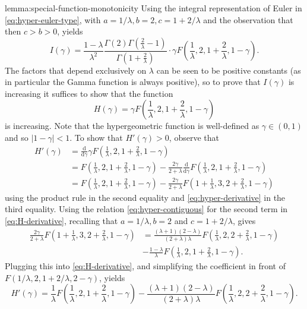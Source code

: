 \documentclass[11pt]{article}
\newcommand{\dd}{\mathrm{d}}
\begin{document}
\begin{cleverproof}{lemma:special-function-monotonicity}
Using the integral representation of Euler in \eqref{eq:hyper-euler-type}, with $a = 1/\lambda, b = 2, c = 1 + 2/\lambda$ and the observation that then $c > b > 0$, yields
$$
I(\gamma) = \frac{1-\lambda}{\lambda^2} \frac{\Gamma(2)\Gamma(\frac{2}{\lambda}-1)}{\Gamma(1+\frac{2}{\lambda})}\cdot\gamma F\left(\frac{1}{\lambda},2,1+\frac{2}{\lambda},1-\gamma\right).
$$
The factors that depend exclusively on $\lambda$ can be seen to be positive constants (as in particular the Gamma function is always positive), so to prove that $I(\gamma)$ is increasing it suffices to show that the function
$$
H(\gamma) = \gamma F\left(\frac{1}{\lambda},2,1+\frac{2}{\lambda},1-\gamma\right)
$$
is increasing. Note that the hypergeometric function is well-defined as $\gamma \in (0,1)$ and so $|1-\gamma| < 1$.
    To show that $H'(\gamma)>0$, observe that
    \begin{align}
    H'(\gamma) &=         \frac{\dd }{\dd \gamma}\gamma F\left(\frac{1}{\lambda},2,1+\frac{2}{\lambda},1-\gamma\right) \nonumber \\
        &=F\left(\frac{1}{\lambda},2,1+\frac{2}{\lambda},1-\gamma\right)-\frac{2\gamma}{2+\lambda} \frac{\dd }{\dd \gamma}F\left(\frac{1}{\lambda},2,1+\frac{2}{\lambda},1-\gamma\right) \nonumber \\
        &=F\left(\frac{1}{\lambda},2,1+\frac{2}{\lambda},1-\gamma\right)-\frac{2\gamma}{2+\lambda} F\left(1+\frac{1}{\lambda},3,2+\frac{2}{\lambda},1-\gamma\right) 
        \label{eq:H-derivative}
    \end{align}
    using the product rule in the second equality and \eqref{eq:hyper-derivative} in the third equality.
    Using the relation \eqref{eq:hyper-contiguous} for the second term in \eqref{eq:H-derivative}, recalling that $a = 1/\lambda, b = 2$ and $c = 1 + 2/\lambda$, gives
    \begin{align*}
        \frac{2\gamma}{2+\lambda} F\left(1+\frac{1}{\lambda},3,2+\frac{2}{\lambda},1-\gamma\right)&=\frac{(\lambda+1)(2-\lambda)}{\left(2+\lambda\right)\lambda}F\left(\frac{1}{\lambda},2,2+\frac{2}{\lambda},1-\gamma\right)\\&-\frac{1-\lambda}{\lambda}F\left(\frac{1}{\lambda},2,1+\frac{2}{\lambda},1-\gamma\right).    
    \end{align*}
    Plugging this into \eqref{eq:H-derivative}, and simplifying the coefficient in front of $F(1/\lambda,2,1 + 2/\lambda,2-\gamma)$, yields
    $$
    H'(\gamma)=\frac{1}{\lambda}F\left(\frac{1}{\lambda},2,1+\frac{2}{\lambda},1-\gamma\right)-\frac{(\lambda+1)(2-\lambda)}{\left(2+\lambda\right)\lambda}F\left(\frac{1}{\lambda},2,2+\frac{2}{\lambda},1-\gamma\right).
$$
\end{cleverproof}
\end{document}
